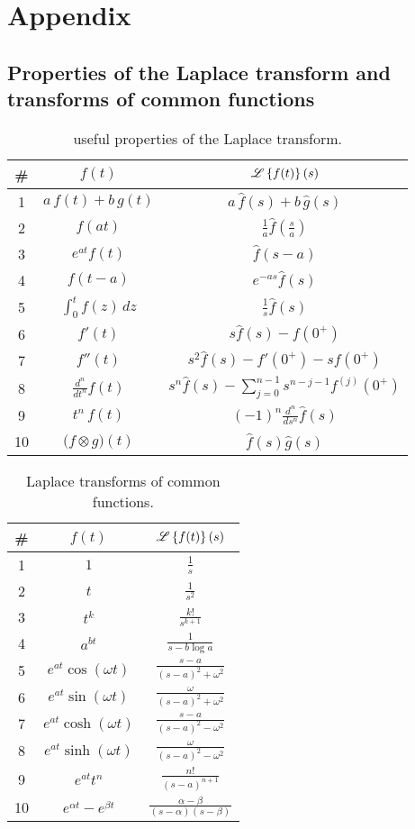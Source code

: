 \chapter{Appendix}
\section{Properties of the Laplace transform and transforms of common functions}
	
	\begin{table}[bht]
	\centering
	\begin{tabular}{c |c |c}
		\# & $f(t)$ & $\mathscr{L} \left\{ f(t) \right\}(s)$ \\ \hline
		1 & $a\, f(t) + b \, g(t)$ & $a \, \hat f(s) + b \, \hat g(s)$ \\ 
		2 & $f(at)$ & $\frac 1 a \hat f\left(\frac s a\right)$ \\
		3 & $e^{at}f(t)$ & $\hat f(s-a)$ \\
		4 & $f(t-a)$ & $e^{-as} \hat f(s)$ \\
		5 & $\int_0^t f(z)\, dz$ & $\frac 1 s \hat f(s)$ \\
		6 & $f'(t)$ & $s \hat f(s) - f(0^+)$ \\
		7 & $f''(t)$ & $s^2 \hat f(s) - f'(0^+) - s f(0^+)$ \\
		8 & $\frac {d^n}{dt^n}f(t)$ & $s^n \hat f(s) - \sum_{j=0}^{n-1} s^{n-j-1} f^{(j)}(0^+) $ \\
		9 & $t^n \, f(t)$ & $(-1)^n \frac{d^n}{ds^n} \hat f(s)$ \\
		10 & $\big(f\otimes g\big)(t)$ & $\hat f(s) \hat g(s)$ \\
	\end{tabular}
	\caption{useful properties of the Laplace transform.} \label{app:lap:properties}
	\end{table}
	

	\begin{table}[bht]
	\centering
	\begin{tabular}{c |c |c}
		\# & $f(t)$ & $\mathscr{L} \left\{ f(t) \right\}(s)$ \\ \hline
		1 & $1$ & $\frac 1 s$ \\
		2 & $t$ & $\frac 1 {s^2}$ \\
		3 & $t^k$ & $\frac{k!}{s^{k+1}}$ \\
		4 & $a^{bt}$ & $\frac{1}{s - b\log a }$ \\
		5 & $e^{at} \cos(\omega t)$ & $\frac{s-a}{(s-a)^2 + \omega^2}$ \\
		6 & $e^{at} \sin(\omega t)$ & $\frac{\omega}{(s-a)^2 + \omega^2}$ \\
		7 & $e^{at} \cosh(\omega t)$ & $\frac{s-a}{(s-a)^2 - \omega^2}$ \\
		8 & $e^{at} \sinh(\omega t)$ & $\frac{\omega}{(s-a)^2 - \omega^2}$ \\
		9 & $e^{at} t^n$ & $\frac{n!}{(s-a)^{n+1}}$ \\
		10 & $e^{\alpha t} - e^{\beta t}$ & $\frac{\alpha - \beta}{(s- \alpha)(s-\beta)}$ \\
		
	\end{tabular}
	\caption{Laplace transforms of common functions.} \label{app:lap:transforms}
	\end{table}